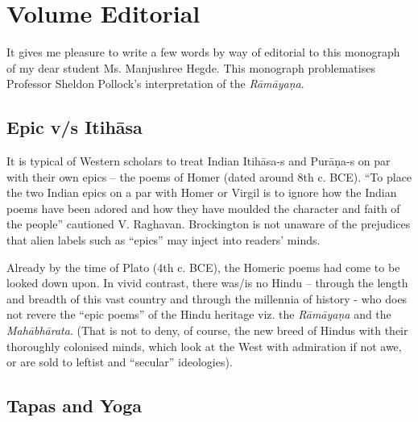 \chapter*{Volume Editorial}\label{volume_editorial}



It gives me pleasure to write a few words by way of editorial to this monograph of my dear student Ms. Manjushree Hegde. This monograph problematises Professor Sheldon Pollock's interpretation of the {\sl Rāmāyaṇa}.\\[-20pt]

\section*{Epic v/s Itihāsa}

It is typical of Western scholars to treat Indian Itihāsa-s and Purāṇa-s on par with their own epics -- the poems of Homer (dated around 8th c. BCE). ``To place the two Indian epics on a par with Homer or Virgil is to ignore how the Indian poems have been adored and how they have moulded the character and faith of the people'' cautioned V. Raghavan. Brockington is not unaware of the prejudices that alien labels such as ``epics'' may inject into readers' minds. 
 
Already by the time of Plato (4th c. BCE), the Homeric poems had come to be looked down upon. In vivid contrast, there was/is no Hindu -- through  the length and breadth of this vast country and through the millennia of history - who does not revere the ``epic poems'' of the Hindu heritage viz. the {\sl Rāmāyaṇa} and the {\sl Mahābhārata}. (That is not to deny, of course, the new breed of Hindus with their thoroughly colonised minds, which look at the West with admiration if not awe, or are sold to leftist and ``secular'' ideologies).\\[-20pt]

\section*{Tapas and Yoga}

